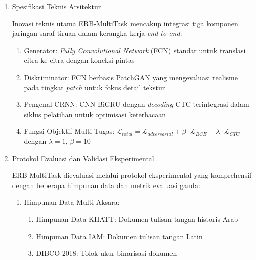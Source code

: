 \begin{enumerate}[leftmargin=*, labelindent=0pt, itemsep=1ex, topsep=0pt]
\begin{enumerate}[leftmargin=1.5em, labelsep=0.5em, itemindent=0pt, noitemsep, topsep=0pt, label=\alph*.]
      \item Dukungan Multi-Aksara \mbox{}\\[0.1em]
            Demonstrasi efektivitas pada aksara Arab (basis data KHATT) dan aksara Latin (basis data IAM), menunjukkan fleksibilitas lintas bahasa.
\end{enumerate}

\item Spesifikasi Teknis Arsitektur
\label{para:erb-spesifikasi}

Inovasi teknis utama ERB-MultiTask mencakup integrasi tiga komponen jaringan saraf tiruan dalam kerangka kerja \textit{end-to-end}:

\begin{enumerate}[leftmargin=1.5em, labelsep=0.5em, itemindent=0pt, noitemsep, topsep=0pt, label=\alph*.]
      \item Generator: \textit{Fully Convolutional Network} (FCN) standar untuk translasi citra-ke-citra dengan koneksi pintas
      \item Diskriminator: FCN berbasis PatchGAN yang mengevaluasi realisme pada tingkat \textit{patch} untuk fokus detail tekstur
      \item Pengenal CRNN: CNN-BiGRU dengan \textit{decoding} CTC terintegrasi dalam siklus pelatihan untuk optimisasi keterbacaan
      \item Fungsi Objektif Multi-Tugas: $\mathcal{L}_{total} = \mathcal{L}_{adversarial} + \beta \cdot \mathcal{L}_{BCE} + \lambda \cdot \mathcal{L}_{CTC}$ dengan $\lambda = 1$, $\beta = 10$
\end{enumerate}

\item Protokol Evaluasi dan Validasi Eksperimental
\label{para:erb-evaluasi}

ERB-MultiTask dievaluasi melalui protokol eksperimental yang komprehensif dengan beberapa himpunan data dan metrik evaluasi ganda:

\begin{enumerate}[leftmargin=1.5em, labelsep=0.5em, itemindent=0pt, label=\arabic*., topsep=0pt, parsep=0pt, itemsep=0.5em]
      \item Himpunan Data Multi-Aksara:
            \begin{enumerate}[leftmargin=1.5em, labelsep=0.5em, itemindent=0pt, noitemsep, topsep=0pt, label=\alph*.]
                  \item Himpunan Data KHATT: Dokumen tulisan tangan historis Arab
                  \item Himpunan Data IAM: Dokumen tulisan tangan Latin
                  \item DIBCO 2018: Tolok ukur binarisasi dokumen
            \end{enumerate}


\end{enumerate}
\end{enumerate}
